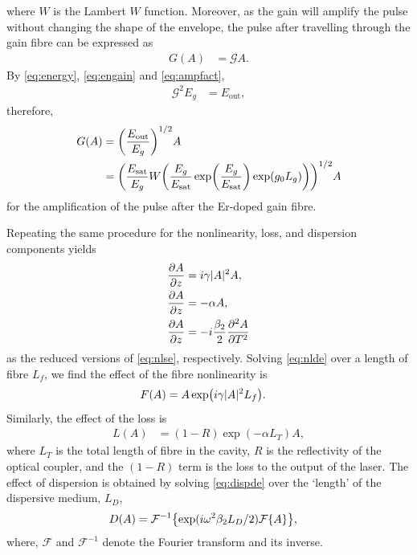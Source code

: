 \documentclass[9pt,twocolumn,twoside]{osajnl}
\let\originalleft\left
\let\originalright\right
\renewcommand{\left}{\mathopen{}\mathclose\bgroup\originalleft}
\renewcommand{\right}{\aftergroup\egroup\originalright}
\newcommand{\pdiff}[3][\hspace{-0.5pt}]{\frac{\partial^{#1}#2}{\partial{#3}^{#1}}} %
\newcommand{\Es}{E_{\textrm{sat}}} %
\newcommand{\FT}[1]{\mathcal{F}\left\{ #1 \right\}} %
\newcommand{\FTi}[1]{\mathcal{F}^{-1}\left\{ #1 \right\}} %
\begin{document}
where $W$ is the Lambert $W$ function. Moreover, as the gain will amplify the pulse without changing the shape of the envelope, the pulse after travelling through the gain fibre can be expressed as
\begin{align}
	G(A) &= \mathcal{G} A.
	\label{eq:ampfact}
\end{align}
By \eqref{eq:energy}, \eqref{eq:engain} and \eqref{eq:ampfact},
\begin{align}
	\mathcal{G}^2 E_g &= E_\text{out},
\end{align}
therefore,
\begin{align}
	G(A) &= \left( \frac{E_\text{out}}{E_g} \right)^{1/2} A \\
	&=	\left( \frac{\Es}{E_g} W \left( \frac{E_g}{\Es} \exp \left( \frac{E_g}{\Es} \right) \exp( g_0 L_g ) \right) \right)^{1/2} A \label{eq:dimgain}
\end{align}
for the amplification of the pulse after the Er-doped gain fibre.

Repeating the same procedure for the nonlinearity, loss, and dispersion components yields
\begin{align}
	\pdiff{A}{z} &= i \gamma |A|^2 A, \label{eq:nlde} \\
	\pdiff{A}{z} &= - \alpha A,  \label{eq:lossde} \\
	\pdiff{A}{z} &= - i \frac{\beta_2}{2} \pdiff[2]{A}{T} \label{eq:dispde}
\end{align}
as the reduced versions of \eqref{eq:nlse}, respectively. Solving \eqref{eq:nlde} over a length of fibre $L_f$, we find the effect of the fibre nonlinearity is
\begin{align}
	F(A) &= A \exp \left( i \gamma |A|^2 L_f \right). \label{eq:dimnl}
\end{align}
Similarly, the effect of the loss is
\begin{align}
	L(A) &= (1 - R) \exp( - \alpha L_T )A, \label{eq:dimloss}
\end{align}
where $L_T$ is the total length of fibre in the cavity, $R$ is the reflectivity of the optical coupler, and the $(1 - R)$ term  is the loss to the output of the laser. The effect of dispersion is obtained by solving \eqref{eq:dispde} over the `length' of the dispersive medium, $L_D$,
\begin{align}
	D(A) &= \FTi{\exp( i \omega^2 \beta_2 L_D / 2 ) \FT{A}}, \label{eq:dimdisp}
\end{align}
where, $\mathcal{F}$ and $\mathcal{F}^{-1}$ denote the Fourier transform and its inverse.
\end{document}
